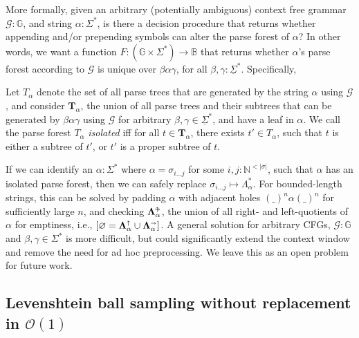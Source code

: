 \documentclass[sigplan,review,anonymous,acmsmall]{acmart}\settopmatter{printfolios=false,printccs=false,printacmref=false}
\begin{document}
More formally, given an arbitrary (potentially ambiguous) context free grammar $\mathcal{G}: \mathbb{G}$, and string $\alpha: \Sigma^*$, is there a decision procedure that returns whether appending and/or prepending symbols can alter the parse forest of $\alpha$? In other words, we want a function $F: (\mathbb{G} \times \Sigma^*) \rightarrow \mathbb{B}$ that returns whether $\alpha$'s parse forest according to $\mathcal{G}$ is unique over $\beta\alpha\gamma$, for all $\beta, \gamma: \underline\Sigma^*$. Specifically,

\begin{definition}[Isolation]\label{def:isolation}
Let $T_\alpha$ denote the set of all parse trees that are generated by the string $\alpha$ using $\mathcal{G}$, and consider $\mathbf{T}_{\alpha}$, the union of all parse trees and their subtrees that can be generated by $\beta\alpha\gamma$ using $\mathcal{G}$ for arbitrary $\beta, \gamma \in \underline\Sigma^*$, and have a leaf in $\alpha$. We call the parse forest $T_\alpha$ \textit{isolated} iff for all $t \in \mathbf{T}_{\alpha}$, there exists $t' \in T_\alpha$, such that $t$ is either a subtree of $t'$, or $t'$ is a proper subtree of $t$.
\end{definition}

If we can identify an $\alpha: \Sigma^*$ where $\alpha = \sigma_{i\ldots j}$ for some $i, j: \mathbb{N}^{<|\sigma|}$, such that $\alpha$ has an isolated parse forest, then we can safely replace $\sigma_{i\ldots j} \mapsto \Lambda_\alpha^*$. For bounded-length strings, this can be solved by padding $\alpha$ with adjacent holes $(\_)^n\alpha(\_)^n$ for sufficiently large $n$, and checking $\bm\Lambda_{\alpha}^{\shortuparrow\hspace{-5pt}\shortrightarrow}$, the union of all right- and left-quotients of $\alpha$ for emptiness, i.e., $[\varnothing = \bm\Lambda_{\alpha}^\shortuparrow\cup\bm\Lambda_{\alpha}^\shortrightarrow]$. A general solution for arbitrary CFGs, $\mathcal{G}: \mathbb{G}$ and $\beta, \gamma \in \Sigma^*$ is more difficult, but could significantly extend the context window and remove the need for ad hoc preprocessing. We leave this as an open problem for future work.
%
%

\subsection{Levenshtein ball sampling without replacement in $\mathcal{O}(1)$}\label{sec:dsi}
\end{document}
